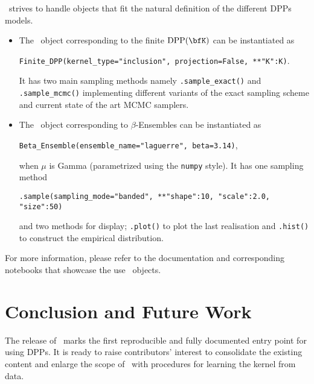 \documentclass[twoside,11pt]{article}
\begin{document}
  \DPPy\ strives to handle objects that fit the natural definition of the different DPPs models.
  \begin{itemize}
	  \item The \DPPy\ object corresponding to the finite $\DPP(\bfK)$ can be instantiated as
	  \begin{nscenter}
	  	\texttt{Finite_DPP(kernel_type="inclusion", projection=False, **{"K":K})}.
	  \end{nscenter}
		It has two main sampling methods namely \texttt{.sample_exact()} and \texttt{.sample_mcmc()} implementing different variants of the exact sampling scheme and current state of the art MCMC samplers.

		\item The \DPPy\ object corresponding to $\beta$-Ensembles can be instantiated as
		\begin{nscenter}
			\texttt{Beta_Ensemble(ensemble_name="laguerre", beta=3.14)},
		\end{nscenter}
		when $\mu$ is Gamma (parametrized using the \texttt{numpy} style).
		It has one sampling method
		\begin{nscenter}
			\texttt{.sample(sampling_mode="banded", **{"shape":10, "scale":2.0, "size":50})}
		\end{nscenter}
		and two methods for display; \texttt{.plot()} to plot the last realisation and \texttt{.hist()} to construct the empirical distribution.

  \end{itemize}

  For more information, please refer to the documentation and corresponding notebooks that showcase the use \DPPy\ objects.




\section{Conclusion and Future Work} %
\label{sec:conclusion_and_future_work}

The release of \DPPy\ marks the first reproducible and fully documented entry point for using DPPs. It is ready to raise contributors' interest to consolidate the existing content and enlarge the scope of \DPPy\ \eg with procedures for learning the kernel from data.

\end{document}
